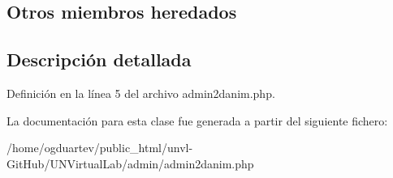 \subsection*{Otros miembros heredados}


\subsection{Descripción detallada}


Definición en la línea 5 del archivo admin2danim.\+php.



La documentación para esta clase fue generada a partir del siguiente fichero\+:\begin{DoxyCompactItemize}
\item 
/home/ogduartev/public\+\_\+html/unvl-\/\+Git\+Hub/\+U\+N\+Virtual\+Lab/admin/admin2danim.\+php\end{DoxyCompactItemize}

